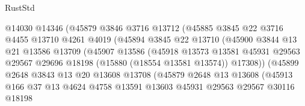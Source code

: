 \begin{lexlean}{RustStd}
\begin{coremodule}
                            @14030
                            @14346
                            (@45879
                              @3846
                              @3716
                              @13712
                              (@45885
                                @3845
                                @22
                                @3716
                                @4455
                                @13710
                                @4261
                                @4019
                                (@45894
                                  @3845
                                  @22
                                  @13710
                                  (@45900
                                    @3844
                                    @13
                                    @21
                                    @13586
                                    @13709
                                    (@45907
                                      @13586
                                      (@45918
                                        @13573
                                        @13581
                                        @45931
                                        @29563
                                        @29567
                                        @29696
                                        @18198
                                        (@15880 (@18554 @13581 @13574))
                                        @17308))
                                    (@45899
                                      @2648
                                      @3843
                                      @13
                                      @20
                                      @13608
                                      @13708
                                      (@45879
                                        @2648
                                        @13
                                        @13608
                                        (@45913
                                          @166
                                          @37
                                          @13
                                          @4624
                                          @4758
                                          @13591
                                          @13603
                                          @45931
                                          @29563
                                          @29567
                                          @30116
                                          @18198

\end{coremodule}
\end{lexlean}
